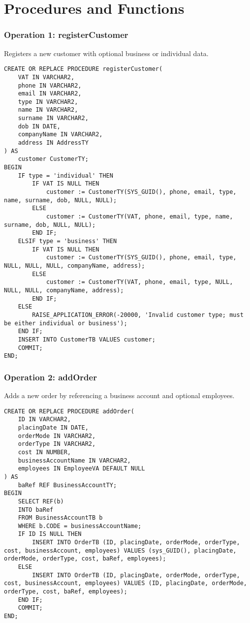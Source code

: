 \chapter{Procedures and Functions}

\subsection*{Operation 1: registerCustomer}
Registers a new customer with optional business or individual data.
\begin{lstlisting}
CREATE OR REPLACE PROCEDURE registerCustomer(
    VAT IN VARCHAR2,
    phone IN VARCHAR2,
    email IN VARCHAR2,
    type IN VARCHAR2,
    name IN VARCHAR2,
    surname IN VARCHAR2,
    dob IN DATE,
    companyName IN VARCHAR2,
    address IN AddressTY
) AS
    customer CustomerTY;
BEGIN
    IF type = 'individual' THEN
        IF VAT IS NULL THEN
            customer := CustomerTY(SYS_GUID(), phone, email, type, name, surname, dob, NULL, NULL);
        ELSE
            customer := CustomerTY(VAT, phone, email, type, name, surname, dob, NULL, NULL);
        END IF;
    ELSIF type = 'business' THEN
        IF VAT IS NULL THEN
            customer := CustomerTY(SYS_GUID(), phone, email, type, NULL, NULL, NULL, companyName, address);
        ELSE
            customer := CustomerTY(VAT, phone, email, type, NULL, NULL, NULL, companyName, address);
        END IF;
    ELSE
        RAISE_APPLICATION_ERROR(-20000, 'Invalid customer type; must be either individual or business');
    END IF;
    INSERT INTO CustomerTB VALUES customer;
    COMMIT;
END;
\end{lstlisting}

\subsection*{Operation 2: addOrder}
Adds a new order by referencing a business account and optional employees.
\begin{lstlisting}
CREATE OR REPLACE PROCEDURE addOrder(
    ID IN VARCHAR2,
    placingDate IN DATE,
    orderMode IN VARCHAR2,
    orderType IN VARCHAR2,
    cost IN NUMBER,
    businessAccountName IN VARCHAR2,
    employees IN EmployeeVA DEFAULT NULL
) AS 
    baRef REF BusinessAccountTY;
BEGIN
    SELECT REF(b)
    INTO baRef
    FROM BusinessAccountTB b
    WHERE b.CODE = businessAccountName;
    IF ID IS NULL THEN
        INSERT INTO OrderTB (ID, placingDate, orderMode, orderType, cost, businessAccount, employees) VALUES (sys_GUID(), placingDate, orderMode, orderType, cost, baRef, employees);
    ELSE
        INSERT INTO OrderTB (ID, placingDate, orderMode, orderType, cost, businessAccount, employees) VALUES (ID, placingDate, orderMode, orderType, cost, baRef, employees);
    END IF;
    COMMIT;
END;
\end{lstlisting}

